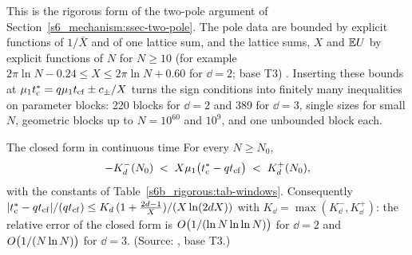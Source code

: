 This is the rigorous form of the two-pole argument of Section~\ref{s6_mechanism:ssec-two-pole}. The pole data are
bounded by explicit functions of $1/\bar X$ and of one lattice sum, and the lattice sums, $X$ and $\mathbb{E} U$ by explicit
functions of $N$ for $N\ge10$ (for example $2\pi\ln N-0.24\le X\le2\pi\ln N+0.60$ for $\dd=2$; base T3)
. Inserting these bounds at $\mu_{1}t^{*}_{\mathrm{c}}=q\mu_{1}t_{\mathrm{cf}}\pm c_\pm/X$ turns
the sign conditions into finitely many inequalities on parameter blocks: 220 blocks for $\dd=2$ and 389 for $\dd=3$,
single sizes for small $N$, geometric blocks up to $N=10^{60}$ and $10^{9}$, and one unbounded block each.

\begin{catheorem}{The closed form in continuous time}\label{s6b_rigorous:thm-cfcont}
For every $N\ge N_0$,
\[
-K^{-}_{d}(N_0)\;<\;X\mu_{1}\bigl(t^{*}_{\mathrm{c}}-qt_{\mathrm{cf}}\bigr)\;<\;K^{+}_{d}(N_0),
\]
with the constants of Table~\ref{s6b_rigorous:tab-windows}. Consequently
$|t^{*}_{\mathrm{c}}-qt_{\mathrm{cf}}|/(qt_{\mathrm{cf}})\le K_{d}\,(1+\frac{2d-1}{X})/(X\ln(2d X))$ with $K_{\dd}=\max(K^{-}_{\dd},K^{+}_{\dd})$: the
relative error of the closed form is $O\bigl(1/(\ln N\ln\ln N)\bigr)$ for $\dd=2$ and $O\bigl(1/(N\ln N)\bigr)$
for $\dd=3$.
\textup{(Source: , base T3.)}
\end{catheorem}

